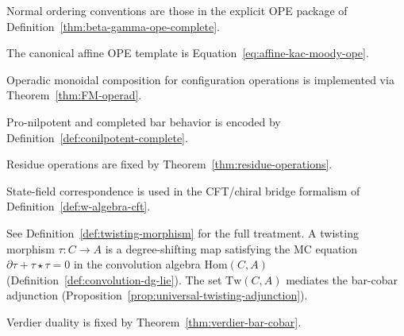 \begin{definition}\label{def:normal-ordering}
Normal ordering conventions are those in the explicit OPE package of Definition~\ref{thm:beta-gamma-ope-complete}.
\end{definition}

\begin{definition}\label{def:ope}
The canonical affine OPE template is Equation~\eqref{eq:affine-kac-moody-ope}.
\end{definition}

\begin{definition}\label{def:operad-as-monoid}
Operadic monoidal composition for configuration operations is implemented via Theorem~\ref{thm:FM-operad}.
\end{definition}

\begin{definition}\label{def:pro-nilpotent}
Pro-nilpotent and completed bar behavior is encoded by
Definition~\ref{def:conilpotent-complete}.
\end{definition}

\begin{definition}\label{def:residue-map}
Residue operations are fixed by Theorem~\ref{thm:residue-operations}.
\end{definition}

\begin{definition}\label{def:state-field-correspondence}
State-field correspondence is used in the CFT/chiral bridge formalism of Definition~\ref{def:w-algebra-cft}.
\end{definition}

\begin{definition}\label{def:twisting-morphism-index}
See Definition~\ref{def:twisting-morphism} for the full treatment.
A twisting morphism $\tau\colon C \to A$ is a degree-shifting map
satisfying the MC equation $\partial\tau + \tau \star \tau = 0$ in
the convolution algebra $\mathrm{Hom}(C, A)$
(Definition~\ref{def:convolution-dg-lie}). The set $\mathrm{Tw}(C, A)$
mediates the bar-cobar adjunction
(Proposition~\ref{prop:universal-twisting-adjunction}).
\end{definition}

\begin{definition}\label{def:verdier-functor}
Verdier duality is fixed by Theorem~\ref{thm:verdier-bar-cobar}.
\end{definition}

